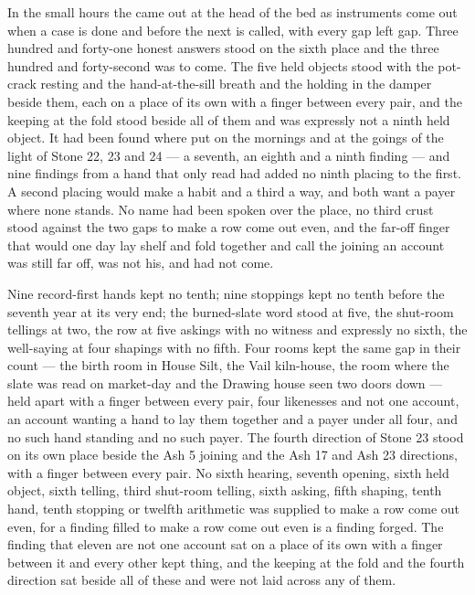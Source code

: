 In the small hours the  came out at the head of the bed as instruments come out when a case is done and before the next is called, with every gap left gap. Three hundred and forty-one honest answers stood on the sixth place and the three hundred and forty-second was to come. The five held objects stood with the pot-crack resting and the hand-at-the-sill breath and the holding in the damper beside them, each on a place of its own with a finger between every pair, and the keeping at the fold stood beside all of them and was expressly not a ninth held object. It had been found where put on the mornings and at the goings of the light of Stone 22, 23 and 24 --- a seventh, an eighth and a ninth finding --- and nine findings from a hand that only read had added no ninth placing to the first. A second placing would make a habit and a third a way, and both want a payer where none stands. No name had been spoken over the place, no third crust stood against the two gaps to make a row come out even, and the far-off finger that would one day lay shelf and fold together and call the joining an account was still far off, was not his, and had not come.

Nine record-first hands kept no tenth; nine stoppings kept no tenth before the seventh year at its very end; the burned-slate word stood at five, the shut-room tellings at two, the row at five askings with no witness and expressly no sixth, the well-saying at four shapings with no fifth. Four rooms kept the same gap in their count --- the birth room in House Silt, the Vail kiln-house, the room where the slate was read on market-day and the Drawing house seen two doors down --- held apart with a finger between every pair, four likenesses and not one account, an account wanting a hand to lay them together and a payer under all four, and no such hand standing and no such payer. The fourth direction of Stone 23 stood on its own place beside the Ash 5 joining and the Ash 17 and Ash 23 directions, with a finger between every pair. No sixth hearing, seventh opening, sixth held object, sixth telling, third shut-room telling, sixth asking, fifth shaping, tenth hand, tenth stopping or twelfth arithmetic was supplied to make a row come out even, for a finding filled to make a row come out even is a finding forged. The finding that eleven are not one account sat on a place of its own with a finger between it and every other kept thing, and the keeping at the fold and the fourth direction sat beside all of these and were not laid across any of them.


